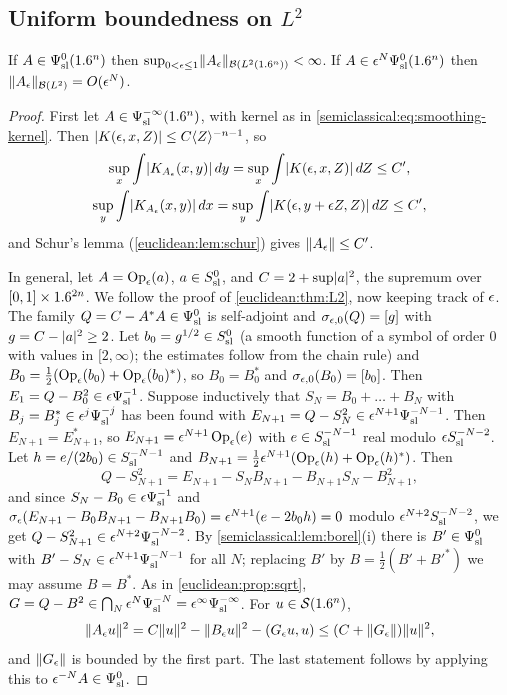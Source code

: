 \subsection{Uniform boundedness on \texorpdfstring{$L^2$}{L2}}
\begin{theorem}\label{semiclassical:thm:L2}
  If $A\in\Psi^{0}_{\mathrm{sl}}(1.6^n)$ then $\sup_{0<\epsilon\le1}\lVert A_\epsilon\rVert_{\mathcal{B}(L^2(1.6^n))}<\infty$.
  If $A\in\epsilon^N\Psi^{0}_{\mathrm{sl}}(1.6^n)$ then $\lVert A_\epsilon\rVert_{\mathcal{B}(L^2)}=O(\epsilon^N)$.
\end{theorem}
\begin{proof}
  First let $A\in\Psi^{-\infty}_{\mathrm{sl}}(1.6^n)$, with kernel as in
  \eqref{semiclassical:eq:smoothing-kernel}. Then
  $\lvert K(\epsilon,x,Z)\rvert\le C\langle Z\rangle^{-n-1}$, so
  \begin{gather*}
    \sup_x\int\lvert K_{A_\epsilon}(x,y)\rvert\,dy=\sup_x\int\lvert K(\epsilon,x,Z)\rvert\,dZ\le C',\\
    \sup_y\int\lvert K_{A_\epsilon}(x,y)\rvert\,dx=\sup_y\int\lvert K(\epsilon,y+\epsilon Z,Z)\rvert\,dZ\le C',
  \end{gather*}
  and Schur's lemma (\cref{euclidean:lem:schur}) gives $\lVert A_\epsilon\rVert\le C'$.

  In general, let $A=\operatorname{Op}_\epsilon(a)$, $a\in S^{0}_{\mathrm{sl}}$, and $C=2+\sup\lvert a\rvert^2$, the
  supremum over $[0,1]\times1.6^{2n}$. We follow the proof of
  \cref{euclidean:thm:L2}, now keeping track of $\epsilon$. The family
  $Q=C-A^*A\in\Psi^{0}_{\mathrm{sl}}$ is self-adjoint and $\sigma_{\epsilon,0}(Q)=[g]$ with
  $g=C-\lvert a\rvert^2\ge2$. Let $b_0=g^{1/2}\in S^{0}_{\mathrm{sl}}$ (a smooth function of a symbol of
  order $0$ with values in $[2,\infty)$; the estimates follow from the chain rule)
  and $B_0=\frac12(\operatorname{Op}_\epsilon(b_0)+\operatorname{Op}_\epsilon(b_0)^*)$, so $B_0=B_0^*$ and
  $\sigma_{\epsilon,0}(B_0)=[b_0]$. Then $E_1=Q-B_0^2\in\epsilon\Psi^{-1}_{\mathrm{sl}}$. Suppose
  inductively that $S_N=B_0+\dots+B_N$ with $B_j=B_j^*\in\epsilon^j\Psi^{-j}_{\mathrm{sl}}$ has
  been found with $E_{N+1}=Q-S_N^2\in\epsilon^{N+1}\Psi^{-N-1}_{\mathrm{sl}}$. Then
  $E_{N+1}=E_{N+1}^*$, so $E_{N+1}=\epsilon^{N+1}\operatorname{Op}_\epsilon(e)$ with $e\in S^{-N-1}_{\mathrm{sl}}$ real
  modulo $\epsilon S^{-N-2}_{\mathrm{sl}}$. Let $h=e/(2b_0)\in S^{-N-1}_{\mathrm{sl}}$ and
  $B_{N+1}=\frac12\epsilon^{N+1}(\operatorname{Op}_\epsilon(h)+\operatorname{Op}_\epsilon(h)^*)$. Then
  \begin{equation*}
    Q-S_{N+1}^2=E_{N+1}-S_NB_{N+1}-B_{N+1}S_N-B_{N+1}^2,
  \end{equation*}
  and since $S_N-B_0\in\epsilon\Psi^{-1}_{\mathrm{sl}}$ and $\sigma_\epsilon(E_{N+1}-B_0B_{N+1}-B_{N+1}B_0)
  =\epsilon^{N+1}(e-2b_0h)=0$ modulo $\epsilon^{N+2}S^{-N-2}_{\mathrm{sl}}$, we get
  $Q-S_{N+1}^2\in\epsilon^{N+2}\Psi^{-N-2}_{\mathrm{sl}}$. By \cref{semiclassical:lem:borel}(i) there is
  $B'\in\Psi^{0}_{\mathrm{sl}}$ with $B'-S_N\in\epsilon^{N+1}\Psi^{-N-1}_{\mathrm{sl}}$ for all $N$; replacing $B'$ by
  $B=\frac12(B'+B'^*)$ we may assume $B=B^*$. As in \cref{euclidean:prop:sqrt},
  $G=Q-B^2\in\bigcap_N\epsilon^N\Psi^{-N}_{\mathrm{sl}}=\epsilon^\infty\Psi^{-\infty}_{\mathrm{sl}}$. For $u\in\mathcal{S}(1.6^n)$,
  \begin{equation*}
    \lVert A_\epsilon u\rVert^2=C\lVert u\rVert^2-\lVert B_\epsilon u\rVert^2-( G_\epsilon u, u)\le(C+\lVert G_\epsilon\rVert)\lVert u\rVert^2,
  \end{equation*}
  and $\lVert G_\epsilon\rVert$ is bounded by the first part. The last statement follows
  by applying this to $\epsilon^{-N}A\in\Psi^{0}_{\mathrm{sl}}$.
\end{proof}

